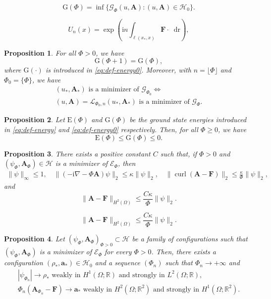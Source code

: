 \documentclass[10pt,a4paper]{amsart}
\newtheorem{proposition}{Proposition}
\newcommand{\Ab}{\mathbf A}
\newcommand{\Ef}{\mathcal E_\Phi}
\newcommand{\En}{\mathrm E(\Phi)}
\newcommand{\Fb}{\mathbf F}
\newcommand{\Gf}{\mathcal G_\Phi}
\newcommand{\Gn}{\mathrm G(\Phi)}
\newcommand{\R}{\mathbb R}
\newcommand{\ab}{\mathbf a}
\newcommand{\cG}{\mathcal G}
\newcommand{\cH}{\mathcal H}
\newcommand{\cL}{\mathcal L}
\DeclareMathOperator{\curl}{curl}
\newcommand{\dd}{\mathop{}\!{\mathrm d}}
\newcommand{\ii}{\mathrm i}
\newcommand{\rG}{\mathrm G}
\begin{document}
\begin{equation}\label{eq:def-energy0}
\Gn=\inf\{\Gf(u,\Ab)\colon (u,\Ab)\in \cH_0\}.
\end{equation}

\begin{equation}\label{eq:def-U-1}
U_n(x)=\exp\left(\ii n\int_{\ell(x_*,x)}\Fb\cdot\dd \mathrm r\right),
\end{equation}

\begin{proposition}\label{prop:GL-eff}
For all $\Phi>0$, we have
\[
    \rG(\Phi+1)=\Gn,
\]
where  $\rG(\cdot)$ is introduced in \eqref{eq:def-energy0}. Moreover, with $n=\lfloor \Phi\rfloor$ and $\Phi_0=\{\Phi\}$, we have
\begin{multline*}
    (u_*,\Ab_*)\text{ is a minimizer of }\cG_{\Phi_0}
    \iff \\
    (u,\Ab)
    =
    \cL_{\Phi_0,n}(u_*,\Ab_*)\text{ is a minimizer of }\Gf.
\end{multline*}
\end{proposition}

\begin{proposition}\label{prop:ub}
Let $\En$ and $\Gn$ be the ground state energies introduced in \eqref{eq:def-energy} and \eqref{eq:def-energy0} respectively. Then, for all $\Phi\geq 0$, we have
\[ \En\leq \Gn\leq 0.\]
\end{proposition}

\begin{proposition}\label{prop:est-min}
There exists a positive constant $C$ such that, if $\Phi>0$ and $(\psi_\Phi,\Ab_\Phi)\in\cH$ is a minimizer  of $\Ef$,  then
\[\begin{gathered}
\|\psi\|_\infty\leq 1,\quad \|(-\ii\nabla-\Phi\Ab)\psi\|_2\leq \kappa\|\psi\|_2,\quad \|\curl(\Ab-\Fb)\|_2\leq \frac{\kappa}{\Phi}\|\psi\|_2,
\end{gathered}\]
and
\begin{equation}\label{eq:curl-div}
\|\Ab-\Fb\|_{H^2(\Omega)}\leq \frac{C\kappa}{\Phi}\|\psi\|_2.
\end{equation}
\end{proposition}

\begin{equation}
\|\Ab-\Fb\|_{H^2(\Omega)}\leq \frac{C\kappa}{\Phi}\|\psi\|_2.
\end{equation}

\begin{proposition}\label{prop:conv-density}
Let  $(\psi_\Phi,\Ab_\Phi)_{\Phi>0}\subset\cH$ be a family of configurations such that $(\psi_\Phi,\Ab_\Phi)$ is a minimizer of $\Ef$ for every $\Phi>0$. Then, there exists a configuration $(\rho_*,\ab_*)\in\cH_0$ and a sequence $(\Phi_n)$ such that $\Phi_n\to+\infty$ and
\[
\begin{gathered}
|\psi_{\Phi_n}|\to \rho_*\text{ weakly in }H^1(\Omega;\R)\text{ and strongly in }L^2(\Omega;\R),\\
\Phi_n(\Ab_{\Phi_n}-\Fb)\to \ab_*\text{ weakly in }H^2(\Omega;\R^2) \text{ and strongly in }H^1(\Omega;\R^2).
\end{gathered}\]
\end{proposition}
\end{document}
